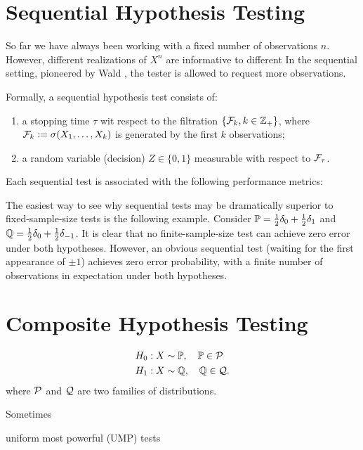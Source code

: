 \section{Sequential Hypothesis Testing}

So far we have always been working with a fixed number of observations $n$.
However, different realizations of $X^n$ are informative to different 
In the sequential setting, pioneered by Wald \cite{}, the tester is allowed to request more observations.

Formally, a sequential hypothesis test consists of:
\begin{enumerate}
    \item a stopping time $\tau$ wit respect to the filtration $\{\mathcal{F}_k,k\in\mathbb{Z}_+\}$, where $\mathcal{F}_k:=\sigma(X_1,\dots,X_k)$ is generated by the first $k$ observations;
    \item a random variable (decision) $Z\in\{0,1\}$ measurable with respect to $\mathcal{F}_\tau$.
\end{enumerate}
Each sequential test is associated with the following performance metrics:

\begin{example}
    The easiest way to see why sequential tests may be dramatically superior to fixed-sample-size tests is the following example.
    Consider $\mathbb{P}=\frac{1}{2}\delta_0+\frac{1}{2}\delta_1$ and $\mathbb{Q}=\frac{1}{2}\delta_0+\frac{1}{2}\delta_{-1}$.
    It is clear that no finite-sample-size test can achieve zero error under both hypotheses.
    However, an obvious sequential test (waiting for the first appearance of $\pm1$) achieves zero error probability, with a finite number of observations in expectation under both hypotheses.
\end{example}



\section{Composite Hypothesis Testing}

\begin{align*}
    &H_0:X\sim \mathbb{P}, \quad \mathbb{P}\in\mathcal{P}\\
    &H_1:X\sim \mathbb{Q}, \quad \mathbb{Q}\in\mathcal{Q}.
\end{align*}
where $\mathcal{P}$ and $\mathcal{Q}$ are two families of distributions.

Sometimes

uniform most powerful (UMP) tests

\begin{example}
    
\end{example}


